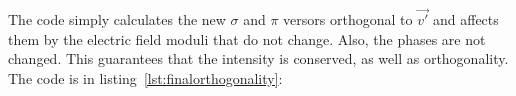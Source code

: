 \documentclass{iucr}
\newcommand{\todo}[1]{{\color{red}[TODO: "#1'']}}
\begin{document}





The code simply calculates the new $\sigma$ and $\pi$ versors orthogonal to $\vec{v'}$ and affects them by the electric field moduli that do not change. 
Also, the phases are not changed. 
This guarantees that the intensity is conserved, as well as orthogonality.
The code is in listing~\ref{lst:finalorthogonality}: 




\end{document}
